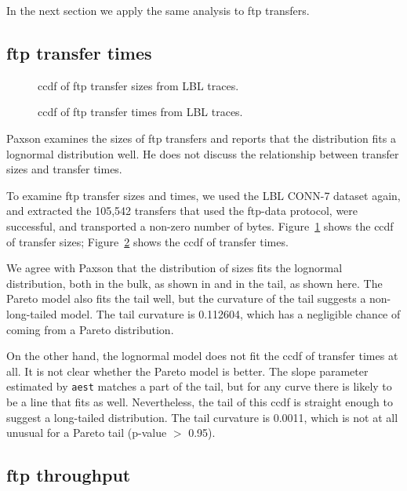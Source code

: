 \documentclass[twocolumn,11pt]{infocom}
\begin{document}
In the next section we apply the same analysis to ftp transfers.


\subsection {ftp transfer times}
\label{ftp}

\begin{figure}[tb]
\centerline{}
\caption{ccdf of ftp transfer sizes from LBL traces.}
\label{fig.tcp.sizes}
\end{figure}

\begin{figure}[tb]
\centerline{}
\caption{ccdf of ftp transfer times from LBL traces.}
\label{fig.tcp.times}
\end{figure}

Paxson \cite{Paxson94} examines the sizes of ftp transfers and
reports that the distribution fits a lognormal distribution well.
He does not discuss the relationship between transfer sizes and
transfer times.

To examine ftp transfer sizes and times, we used the LBL CONN-7
dataset again, and extracted the 105,542 transfers that used the
ftp-data protocol, were successful, and transported a non-zero number
of bytes.  Figure~\ref{fig.tcp.sizes} shows the ccdf of transfer
sizes; Figure~\ref{fig.tcp.times} shows the ccdf of transfer times.

We agree with Paxson that the distribution of sizes fits the
lognormal distribution, both in the bulk, as shown in \cite{Paxson94}
and in the tail, as shown here.  The Pareto model also fits the
tail well, but the curvature of the tail 
suggests a non-long-tailed model.  The tail curvature
is 0.112604, which has a negligible chance of coming from a Pareto
distribution.

On the other hand, the lognormal model does not fit the ccdf of
transfer times at all.  It is not clear whether the Pareto model is
better.  The slope parameter estimated by \texttt{aest} matches a part
of the tail, but for any curve there is likely to be a line that fits
as well.  Nevertheless, the tail of this ccdf is straight enough to
suggest a long-tailed distribution.  The tail curvature is 0.0011,
which is not at all unusual for a Pareto tail (p-value $>$ 0.95).

\subsection {ftp throughput}
\end{document}
